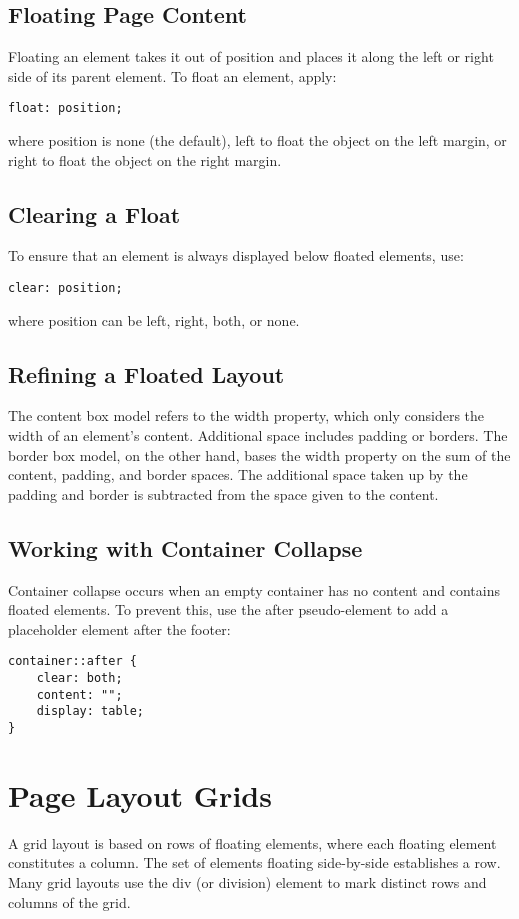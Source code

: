 \documentclass{article}
\begin{document}
\subsection{Floating Page Content}
Floating an element takes it out of position and places it along the left or right side of its parent element. To float an element, apply:
\begin{lstlisting}
float: position;
\end{lstlisting}
where position is none (the default), left to float the object on the left margin, or right to float the object on the right margin.

\subsection{Clearing a Float}
To ensure that an element is always displayed below floated elements, use:
\begin{lstlisting}
clear: position;
\end{lstlisting}
where position can be left, right, both, or none. 

\subsection{Refining a Floated Layout}
The content box model refers to the width property, which only considers the width of an element's content. Additional space includes padding or borders. The border box model, on the other hand, bases the width property on the sum of the content, padding, and border spaces. The additional space taken up by the padding and border is subtracted from the space given to the content.

\subsection{Working with Container Collapse}
Container collapse occurs when an empty container has no content and contains floated elements. To prevent this, use the after pseudo-element to add a placeholder element after the footer:
\begin{lstlisting}
container::after {
    clear: both;
    content: "";
    display: table;
}
\end{lstlisting}

\section{Page Layout Grids}
A grid layout is based on rows of floating elements, where each floating element constitutes a column. The set of elements floating side-by-side establishes a row. Many grid layouts use the div (or division) element to mark distinct rows and columns of the grid.
\end{document}
